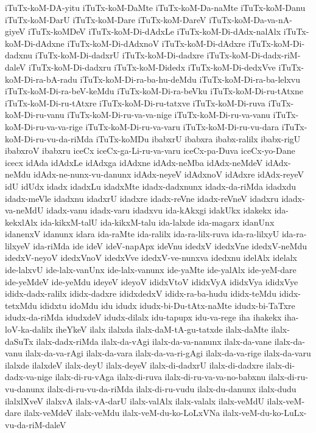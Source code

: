 {iTuTx-koM-DA-yitu
iTuTx-koM-DaMte
iTuTx-koM-Da-naMte
iTuTx-koM-Danu
iTuTx-koM-DarU
iTuTx-koM-Dare
iTuTx-koM-DareV
iTuTx-koM-Da-va-nA-giyeV
iTuTx-koMDeV
iTuTx-koM-Di-dAdxLe
iTuTx-koM-Di-dAdx-nalAlx
iTuTx-koM-Di-dAdxne
iTuTx-koM-Di-dAdxnoV
iTuTx-koM-Di-dAdxre
iTuTx-koM-Di-dadxnu
iTuTx-koM-Di-dadxrU
iTuTx-koM-Di-dadxre
iTuTx-koM-Di-dadx-riM-daleV
iTuTx-koM-Di-dadxru
iTuTx-koM-Didedx
iTuTx-koM-Di-dedxVve
iTuTx-koM-Di-ra-bA-radu
iTuTx-koM-Di-ra-ba-hu-deMdu
iTuTx-koM-Di-ra-ba-lelxvu
iTuTx-koM-Di-ra-beV-keMdu
iTuTx-koM-Di-ra-beVku
iTuTx-koM-Di-ru-tAtxne
iTuTx-koM-Di-ru-tAtxre
iTuTx-koM-Di-ru-tatxve
iTuTx-koM-Di-ruva
iTuTx-koM-Di-ru-vanu
iTuTx-koM-Di-ru-va-va-nige
iTuTx-koM-Di-ru-va-vanu
iTuTx-koM-Di-ru-va-va-rige
iTuTx-koM-Di-ru-va-varu
iTuTx-koM-Di-ru-vu-dara
iTuTx-koM-Di-ru-vu-da-riMda
iTuTx-koMDu
ibabxrU
ibabxra
ibabx-ralilx
ibabx-rigU
ibabxroV
ibabxru
iceCx
iceCx-ga-Li-ru-va-varu
iceCx-pa-Duva
iceCx-yo-Dane
icecx
idAda
idAdxLe
idAdxga
idAdxne
idAdx-neMba
idAdx-neMdeV
idAdx-neMdu
idAdx-ne-nunx-vu-danunx
idAdx-neyeV
idAdxnoV
idAdxre
idAdx-reyeV
idU
idUdx
idadx
idadxLu
idadxMte
idadx-dadxnunx
idadx-da-riMda
idadxdu
idadx-meVle
idadxnu
idadxrU
idadxre
idadx-reVne
idadx-reVneV
idadxru
idadx-va-neMdU
idadx-vanu
idadx-varu
idadxvu
ida-kAkxgi
idakUkx
idakekx
ida-kekxlAlx
ida-kikxM-talU
ida-kikxM-talu
ida-lalxde
ida-magarx
idanUnx
idanenxV
idanunx
idara
ida-raMte
ida-ralilx
ida-ra-lilx-ruva
ida-ra-lilxyU
ida-ra-lilxyeV
ida-riMda
ide
ideV
ideV-napApx
ideVnu
idedxV
idedxVne
idedxV-neMdu
idedxV-neyoV
idedxVnoV
idedxVve
idedxV-ve-nunxva
idedxnu
idelAlx
idelalx
ide-lalxvU
ide-lalx-vanUnx
ide-lalx-vanunx
ide-yaMte
ide-yalAlx
ide-yeM-dare
ide-yeMdeV
ide-yeMdu
ideyeV
ideyoV
ididxVtoV
ididxVyA
ididxVya
ididxVye
ididx-dadx-ralilx
ididx-dadxre
ididxdedxV
ididx-ra-ba-hudu
ididx-teMdu
ididx-tetxMdu
ididxtu
idoMdu
idu
idudx
idudx-bi-Du-tAtx-naMte
idudx-bi-TaTxre
idudx-da-riMda
idudxdeV
idudx-dilalx
idu-tapupx
idu-va-rege
iha
ihakekx
iha-loV-ka-dalilx
iheYkeV
ilalx
ilalxda
ilalx-daM-tA-gu-tatxde
ilalx-daMte
ilalx-daSuTx
ilalx-dadx-riMda
ilalx-da-vAgi
ilalx-da-va-nanunx
ilalx-da-vane
ilalx-da-vanu
ilalx-da-va-rAgi
ilalx-da-vara
ilalx-da-va-ri-gAgi
ilalx-da-va-rige
ilalx-da-varu
ilalxde
ilalxdeV
ilalx-deyU
ilalx-deyeV
ilalx-di-dadxrU
ilalx-di-dadxre
ilalx-di-dadx-va-nige
ilalx-di-ru-vAga
ilalx-di-ruva
ilalx-di-ru-va-va-no-babxnu
ilalx-di-ru-vu-danunx
ilalx-di-ru-vu-da-riMda
ilalx-di-ru-vudu
ilalx-du-danunx
ilalx-dudu
ilalxlXveV
ilalxvA
ilalx-vA-darU
ilalx-valAlx
ilalx-valalx
ilalx-veMdU
ilalx-veM-dare
ilalx-veMdeV
ilalx-veMdu
ilalx-veM-du-ko-LoLxVNa
ilalx-veM-du-ko-LuLx-vu-da-riM-daleV
}
